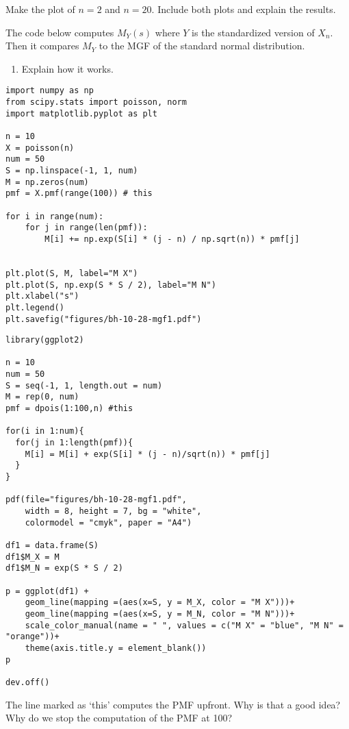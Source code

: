 \begin{exercise}
Make the plot of $n=2$ and $n=20$. Include both plots and explain the results.
\end{exercise}

\begin{exercise}
The code below computes $M_{Y}(s)$ where $Y$ is the standardized version of $X_{n}$. Then it compares $M_Y$ to the MGF of the standard normal distribution.
\begin{enumerate}
\item Explain how it works.
\end{enumerate}
\end{exercise}

\begin{verbatim}
import numpy as np
from scipy.stats import poisson, norm
import matplotlib.pyplot as plt

n = 10
X = poisson(n)
num = 50
S = np.linspace(-1, 1, num)
M = np.zeros(num)
pmf = X.pmf(range(100)) # this

for i in range(num):
    for j in range(len(pmf)):
        M[i] += np.exp(S[i] * (j - n) / np.sqrt(n)) * pmf[j]


plt.plot(S, M, label="M X")
plt.plot(S, np.exp(S * S / 2), label="M N")
plt.xlabel("s")
plt.legend()
plt.savefig("figures/bh-10-28-mgf1.pdf")
\end{verbatim}

\begin{verbatim}
library(ggplot2)  

n = 10
num = 50
S = seq(-1, 1, length.out = num)
M = rep(0, num)
pmf = dpois(1:100,n) #this

for(i in 1:num){
  for(j in 1:length(pmf)){
    M[i] = M[i] + exp(S[i] * (j - n)/sqrt(n)) * pmf[j]
  }
}

pdf(file="figures/bh-10-28-mgf1.pdf",
    width = 8, height = 7, bg = "white",          
    colormodel = "cmyk", paper = "A4")

df1 = data.frame(S)
df1$M_X = M
df1$M_N = exp(S * S / 2)

p = ggplot(df1) +
    geom_line(mapping =(aes(x=S, y = M_X, color = "M X")))+
    geom_line(mapping =(aes(x=S, y = M_N, color = "M N")))+
    scale_color_manual(name = " ", values = c("M X" = "blue", "M N" = "orange"))+
    theme(axis.title.y = element_blank())
p

dev.off()
\end{verbatim}

\begin{exercise}
The line marked as `this' computes the PMF upfront. Why is that a good idea?
Why do we stop the computation of the PMF at 100?
\end{exercise}


